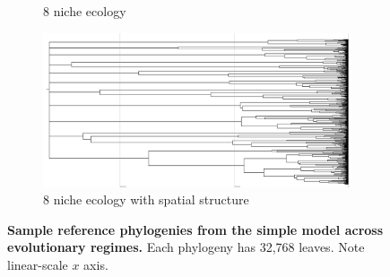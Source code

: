 \begin{figure}
\begin{subfigure}[b]{0.5\columnwidth}
    \caption{%
      8 niche ecology}
  \end{subfigure}
  \hfill
  \begin{subfigure}[b]{0.5\columnwidth}
    \includegraphics[height=0.12\textheight,width=\textwidth]{img/perfect-tree-phylogenies-log/epoch=7+resolution=3+treatment=18/a=collapsed-phylogeny+epoch=00007+mut_distn=np.random.standard_normal+num_generations=32768+num_islands=1024+num_niches=8+p_island_migration=0.01+p_niche_invasion=3.0517578125e-08+population_size=3276.../8+replicate=0+tournament_size=2+treatment=18+_generation=262144+_index=18+scale=nonlog+ext=.pdf}
    \caption{%
      8 niche ecology with spatial structure}
  \end{subfigure}
  \hfill
  \caption{%
    \textbf{Sample reference phylogenies from the simple model across evolutionary regimes.}
    Each phylogeny has 32,768 leaves.
    Note linear-scale $x$ axis.
  }
  \label{fig:perfect-tree-phylogenies-nonlog}
\end{figure}


